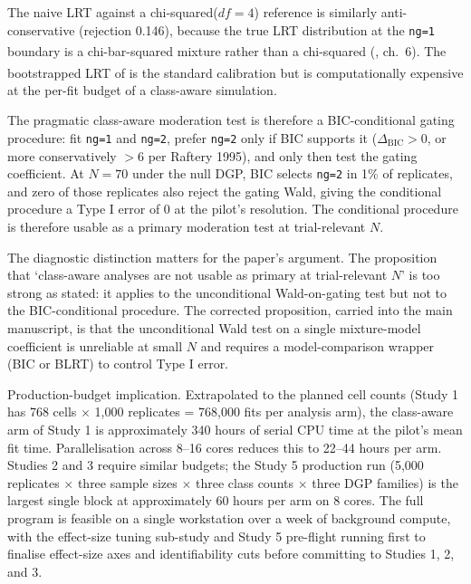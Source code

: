 \documentclass[
  11pt,
]{article}
\begin{document}
The naive LRT against a chi-squared(\(df=4\)) reference is similarly
anti-conservative (rejection 0.146), because the true LRT distribution
at the \texttt{ng=1} boundary is a chi-bar-squared mixture rather than
a chi-squared (\textsuperscript{}, ch.~6). The bootstrapped LRT of\textsuperscript{} is the standard calibration but is computationally
expensive at the per-fit budget of a class-aware simulation.

The pragmatic class-aware moderation test is therefore a
BIC-conditional gating procedure: fit \texttt{ng=1} and \texttt{ng=2},
prefer \texttt{ng=2} only if BIC supports it
(\(\Delta_{\text{BIC}} > 0\), or more conservatively \(> 6\) per Raftery
1995), and only then test the gating coefficient. At \(N = 70\) under
the null DGP, BIC selects \texttt{ng=2} in 1\% of replicates, and
zero of those replicates also reject the gating Wald, giving the
conditional procedure a Type I error of 0 at the pilot's resolution.
The conditional procedure is therefore usable as a primary moderation
test at trial-relevant \(N\).

The diagnostic distinction matters for the paper's argument. The
proposition that `class-aware analyses are not usable as primary at
trial-relevant \(N\)' is too strong as stated: it applies to the
unconditional Wald-on-gating test but not to the BIC-conditional
procedure. The corrected proposition, carried into the main
manuscript, is that the unconditional Wald test on a single
mixture-model coefficient is unreliable at small \(N\) and requires a
model-comparison wrapper (BIC or BLRT) to control Type I error.

Production-budget implication. Extrapolated to the planned cell
counts (Study 1 has 768 cells \(\times\) 1,000 replicates = 768,000 fits
per analysis arm), the class-aware arm of Study 1 is approximately 340
hours of serial CPU time at the pilot's mean fit time. Parallelisation
across 8--16 cores reduces this to 22--44 hours per arm. Studies 2 and
3 require similar budgets; the Study 5 production run (5,000 replicates
\(\times\) three sample sizes \(\times\) three class counts \(\times\) three
DGP families) is the largest single block at approximately 60 hours per
arm on 8 cores. The full program is feasible on a single workstation
over a week of background compute, with the effect-size tuning
sub-study and Study 5 pre-flight running first to finalise
effect-size axes and identifiability cuts before committing to
Studies 1, 2, and 3.
\end{document}

